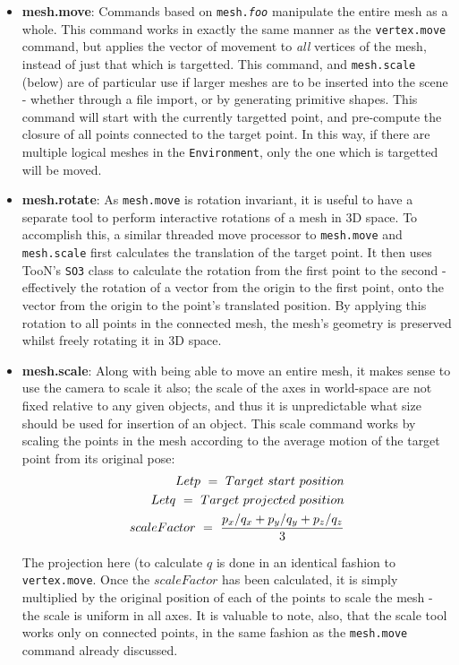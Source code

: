\documentclass[a4paper,10pt]{article}
\begin{document}
\begin{itemize}
\item{\textbf{mesh.move}: Commands based on \texttt{mesh.\textit{foo}} manipulate the entire mesh as a whole. This command works in exactly the same manner as the \texttt{vertex.move} command, but applies the vector of movement to \textit{all} vertices of the mesh, instead of just that which is targetted. This command, and \texttt{mesh.scale} (below) are of particular use if larger meshes are to be inserted into the scene - whether through a file import, or by generating primitive shapes. This command will start with the currently targetted point, and pre-compute the closure of all points connected to the target point. In this way, if there are multiple logical meshes in the \texttt{Environment}, only the one which is targetted will be moved.}

\item{\textbf{mesh.rotate}: As \texttt{mesh.move} is rotation invariant, it is useful to have a separate tool to perform interactive rotations of a mesh in 3D space. To accomplish this, a similar threaded move processor to \texttt{mesh.move} and \texttt{mesh.scale} first calculates the translation of the target point. It then uses TooN's \texttt{SO3} class to calculate the rotation from the first point to the second - effectively the rotation of a vector from the origin to the first point, onto the vector from the origin to the point's translated position. By applying this rotation to all points in the connected mesh, the mesh's geometry is preserved whilst freely rotating it in 3D space.}

\item{\textbf{mesh.scale}: Along with being able to move an entire mesh, it makes sense to use the camera to scale it also; the scale of the axes in world-space are not fixed relative to any given objects, and thus it is unpredictable what size should be used for insertion of an object. This scale command works by scaling the points in the mesh according to the average motion of the target point from its original pose:
\begin{eqnarray*}
  Let p ~=~ Target~start~position \\
  Let q ~=~ Target~projected~position \\
  scaleFactor ~=~ {p_x / q_x + p_y / q_y + p_z / q_z \over 3}  
\end{eqnarray*}

The projection here (to calculate $q$ is done in an identical fashion to \texttt{vertex.move}. Once the $scaleFactor$ has been calculated, it is simply multiplied by the original position of each of the points to scale the mesh - the scale is uniform in all axes. It is valuable to note, also, that the scale tool works only on connected points, in the same fashion as the \texttt{mesh.move} command already discussed.}


\end{itemize}
\end{document}
